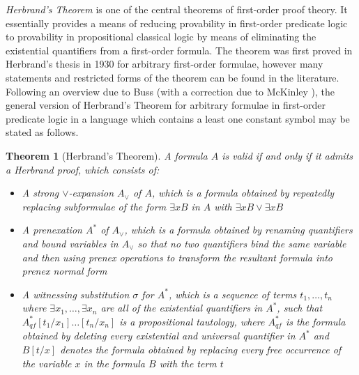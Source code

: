 \documentclass[10pt]{article}
\newtheorem{theorem}{Theorem}[section]
\theoremstyle{definition}\newtheorem{remark}[theorem]{Remark}
\theoremstyle{definition}\newtheorem{example}[theorem]{Example}
\theoremstyle{definition}\newtheorem{definition}[theorem]{Definition}
\begin{document}
	\textit{Herbrand's Theorem} \cite{HerbrandThesis} is one of the central theorems of first-order proof theory. It essentially provides a means of reducing provability in first-order predicate logic to provability in propositional classical logic by means of eliminating the existential quantifiers from a first-order formula. The theorem was first proved in Herbrand's thesis in 1930 for arbitrary first-order formulae, however many statements and restricted forms of the theorem can be found in the literature. Following an overview due to Buss \cite{BussHerbrand, BussIntroductionToProofTheory} (with a correction due to McKinley \cite{McKinleyBussCorrection}), the general version of Herbrand's Theorem for arbitrary formulae in first-order predicate logic in a language which contains a least one constant symbol may be stated as follows.
	\begin{theorem}[Herbrand's Theorem]\label{BussHerbrandStatement}
		A formula $A$ is valid if and only if it admits a \textit{Herbrand proof}, which consists of:
		\begin{itemize}
			\item A \textit{strong $\lor$-expansion} $A_\lor$ of $A$, which is a formula obtained by repeatedly replacing subformulae of the form $\exists x B$ in $A$ with $\exists x B \lor \exists x B$
			
			\item A prenexation $A^*$ of $A_\lor$, which is a formula obtained by renaming quantifiers and bound variables in $A_\lor$ so that no two quantifiers bind the same variable and then using prenex operations to transform the resultant formula into prenex normal form
			
			\item A witnessing substitution $\sigma$ for $A^*$, which is a sequence of terms $t_1, \dots, t_n$ where $\exists x_1, \dots, \exists x_n$ are all of the existential quantifiers in $A^*$, such that $A^*_{qf} [t_1 / x_1] \dots [t_n / x_n]$ is a propositional tautology, where $A^*_{qf}$ is the formula obtained by deleting every existential and universal quantifier in $A^*$ and $B [t / x]$ denotes the formula obtained by replacing every free occurrence of the variable $x$ in the formula $B$ with the term $t$
		\end{itemize}
	\end{theorem}
\end{document}
